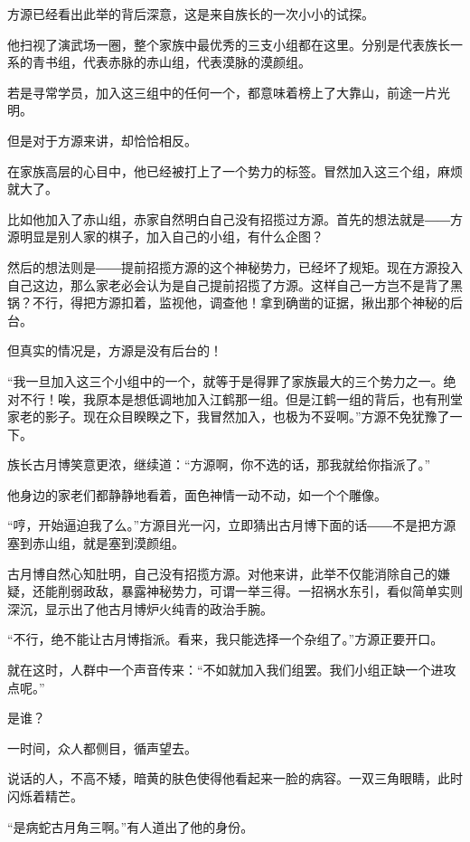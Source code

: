 
\begin{this_body}

方源已经看出此举的背后深意，这是来自族长的一次小小的试探。

他扫视了演武场一圈，整个家族中最优秀的三支小组都在这里。分别是代表族长一系的青书组，代表赤脉的赤山组，代表漠脉的漠颜组。

若是寻常学员，加入这三组中的任何一个，都意味着榜上了大靠山，前途一片光明。

但是对于方源来讲，却恰恰相反。

在家族高层的心目中，他已经被打上了一个势力的标签。冒然加入这三个组，麻烦就大了。

比如他加入了赤山组，赤家自然明白自己没有招揽过方源。首先的想法就是――方源明显是别人家的棋子，加入自己的小组，有什么企图？

然后的想法则是――提前招揽方源的这个神秘势力，已经坏了规矩。现在方源投入自己这边，那么家老必会认为是自己提前招揽了方源。这样自己一方岂不是背了黑锅？不行，得把方源扣着，监视他，调查他！拿到确凿的证据，揪出那个神秘的后台。

但真实的情况是，方源是没有后台的！

“我一旦加入这三个小组中的一个，就等于是得罪了家族最大的三个势力之一。绝对不行！唉，我原本是想低调地加入江鹤那一组。但是江鹤一组的背后，也有刑堂家老的影子。现在众目睽睽之下，我冒然加入，也极为不妥啊。”方源不免犹豫了一下。

族长古月博笑意更浓，继续道：“方源啊，你不选的话，那我就给你指派了。”

他身边的家老们都静静地看着，面色神情一动不动，如一个个雕像。

“哼，开始逼迫我了么。”方源目光一闪，立即猜出古月博下面的话――不是把方源塞到赤山组，就是塞到漠颜组。

古月博自然心知肚明，自己没有招揽方源。对他来讲，此举不仅能消除自己的嫌疑，还能削弱政敌，暴露神秘势力，可谓一举三得。一招祸水东引，看似简单实则深沉，显示出了他古月博炉火纯青的政治手腕。

“不行，绝不能让古月博指派。看来，我只能选择一个杂组了。”方源正要开口。

就在这时，人群中一个声音传来：“不如就加入我们组罢。我们小组正缺一个进攻点呢。”

是谁？

一时间，众人都侧目，循声望去。

说话的人，不高不矮，暗黄的肤色使得他看起来一脸的病容。一双三角眼睛，此时闪烁着精芒。

“是病蛇古月角三啊。”有人道出了他的身份。


\end{this_body}
